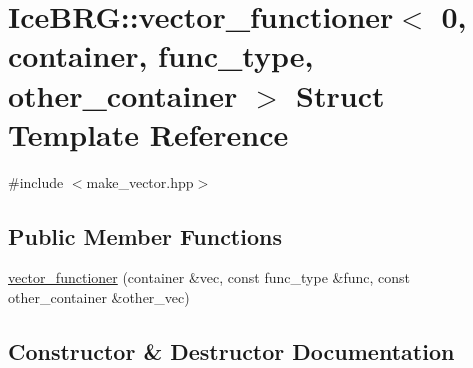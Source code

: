 \hypertarget{structIceBRG_1_1vector__functioner_3_010_00_01container_00_01func__type_00_01other__container_01_4}{}\section{Ice\+B\+R\+G\+:\+:vector\+\_\+functioner$<$ 0, container, func\+\_\+type, other\+\_\+container $>$ Struct Template Reference}
\label{structIceBRG_1_1vector__functioner_3_010_00_01container_00_01func__type_00_01other__container_01_4}


{\ttfamily \#include $<$make\+\_\+vector.\+hpp$>$}

\subsection*{Public Member Functions}
\begin{DoxyCompactItemize}
\item 
\hyperlink{structIceBRG_1_1vector__functioner_3_010_00_01container_00_01func__type_00_01other__container_01_4_a45c40a05e5701c54e1b0997d841ff55e}{vector\+\_\+functioner} (container \&vec, const func\+\_\+type \&func, const other\+\_\+container \&other\+\_\+vec)
\end{DoxyCompactItemize}


\subsection{Constructor \& Destructor Documentation}
\hypertarget{structIceBRG_1_1vector__functioner_3_010_00_01container_00_01func__type_00_01other__container_01_4_a45c40a05e5701c54e1b0997d841ff55e}{}
